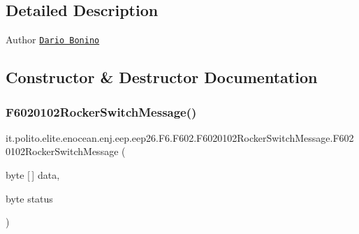 \subsection{Detailed Description}
\begin{DoxyAuthor}{Author}
\href{mailto:dario.bonino@gmail.com}{\tt Dario Bonino} 
\end{DoxyAuthor}


\subsection{Constructor \& Destructor Documentation}
\hypertarget{classit_1_1polito_1_1elite_1_1enocean_1_1enj_1_1eep_1_1eep26_1_1_f6_1_1_f602_1_1_f6020102_rocker_switch_message_a6c0fc2abf1593e4da4b1b3c62d346c37}{}\label{classit_1_1polito_1_1elite_1_1enocean_1_1enj_1_1eep_1_1eep26_1_1_f6_1_1_f602_1_1_f6020102_rocker_switch_message_a6c0fc2abf1593e4da4b1b3c62d346c37} 
\subsubsection{\texorpdfstring{F6020102\+Rocker\+Switch\+Message()}{F6020102RockerSwitchMessage()}}
{\footnotesize\ttfamily it.\+polito.\+elite.\+enocean.\+enj.\+eep.\+eep26.\+F6.\+F602.\+F6020102\+Rocker\+Switch\+Message.\+F6020102\+Rocker\+Switch\+Message (\begin{DoxyParamCaption}\item[{byte \mbox{[}$\,$\mbox{]}}]{data,  }\item[{byte}]{status }\end{DoxyParamCaption})}



